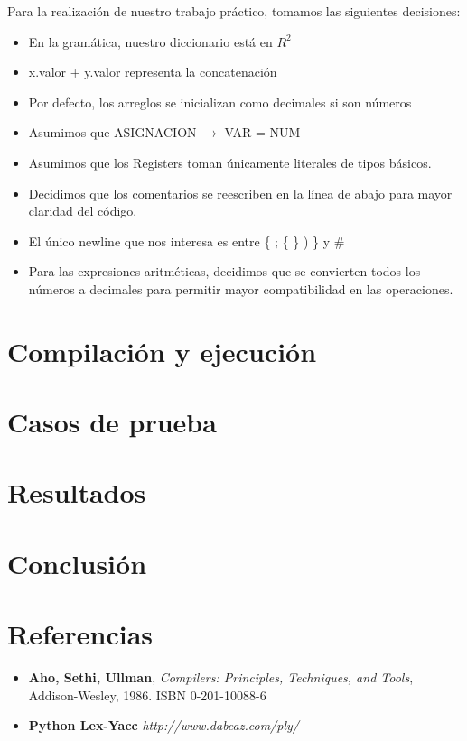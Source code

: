 \documentclass[10pt,a4paper]{article}
\begin{document}
Para la realización de nuestro trabajo práctico, tomamos las siguientes decisiones:
\begin{itemize}
\item En la gramática, nuestro diccionario está en $R^2$ 

\item x.valor + y.valor representa la concatenación

\item Por defecto, los arreglos se inicializan como decimales si son números

\item Asumimos que ASIGNACION $\rightarrow$ VAR = NUM 

\item Asumimos que los Registers toman únicamente literales de tipos básicos.

\item Decidimos que los comentarios se reescriben en la línea de abajo para mayor claridad del código.

\item El único newline que nos interesa es entre \{ ; \{ \} ) \} y \#

\item Para las expresiones aritméticas, decidimos que se convierten todos los números a decimales para permitir mayor compatibilidad en las operaciones.
\end{itemize}


\section{Compilación y ejecución}

\section{Casos de prueba}

\section{Resultados}

\section{Conclusión}

\section{Referencias}
\begin{itemize}
\item \textbf{Aho, Sethi, Ullman}, \textit{Compilers: Principles, Techniques, and Tools}, Addison-Wesley, 1986. ISBN 0-201-10088-6

\item \textbf{Python Lex-Yacc} \textit{http://www.dabeaz.com/ply/}
\end{itemize}
\end{document}
